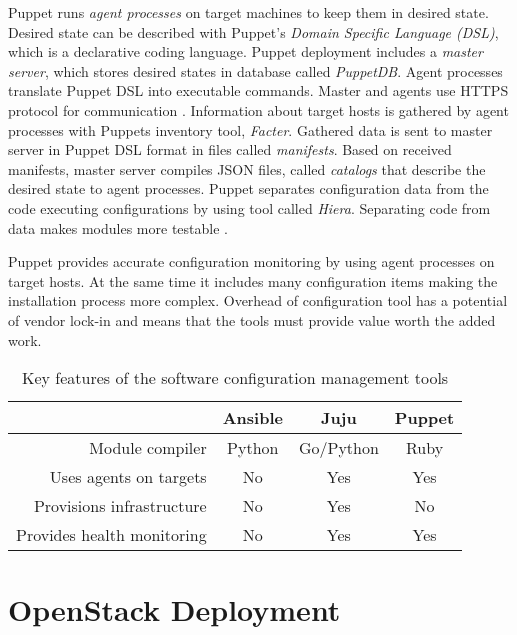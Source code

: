 Puppet runs \textit{agent processes} on target machines to keep them in desired
state. Desired state can be described with Puppet's \textit{Domain Specific
Language (DSL)}, which is a declarative coding language. Puppet deployment
includes a \textit{master server}, which stores desired states in database
called \textit{PuppetDB}. Agent processes translate Puppet DSL into executable
commands. Master and agents use HTTPS protocol for communication \cite{puppet}.
Information about target hosts is gathered by agent processes with Puppets
inventory tool, \textit{Facter}. Gathered data is sent to master server in
Puppet DSL format in files called \textit{manifests}. Based on received
manifests, master server compiles JSON files, called \textit{catalogs} that
describe the desired state to agent processes. Puppet separates configuration
data from the code executing configurations by using tool called
\textit{Hiera}. Separating code from data makes modules more testable
\cite{puppet}.

Puppet provides accurate configuration monitoring by using agent processes on
target hosts. At the same time it includes many configuration items making the
installation process more complex. Overhead of configuration tool has a
potential of vendor lock-in and means that the tools must provide value worth
the added work.

\begin{table}
\centering

\begin{tabular} {r|c c c}
                            & Ansible & Juju      & Puppet \\
\hline
Module compiler             & Python  & Go/Python & Ruby   \\
Uses agents on targets      & No      & Yes       & Yes    \\
Provisions infrastructure   & No      & Yes       & No     \\
Provides health monitoring  & No      & Yes       & Yes    \\
\end{tabular}

\caption{Key features of the software configuration management tools}
\end{table}

\chapter{OpenStack Deployment}\label{deployment}

